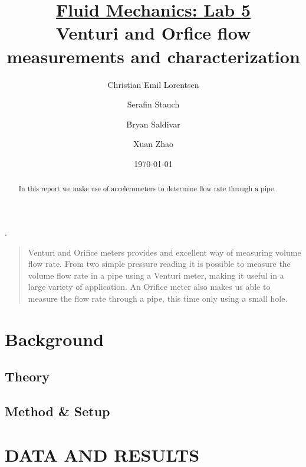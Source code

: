 \documentclass[%
 aapm,
 mph,%
 amsmath,amssymb,
 reprint,%
]{revtex4-2}
\begin{document}
\noindent
{}

\title[]{\underline{Fluid Mechanics: Lab 5} \\
Venturi and Orfice flow measurements and characterization}.%

\author{Christian Emil Lorentsen}%
\author{Serafin Stauch}
\author{Bryan Saldivar}
\author{Xuan Zhao}

\date{\today}%
\begin{abstract}
In this report we make use of accelerometers to determine flow rate through a pipe.

\end{abstract}

\maketitle
\linenumbers\relax %
\begin{quotation}
Venturi and Orifice meters provides and excellent way of measuring volume flow rate. From two simple pressure reading it is possible to measure the volume flow rate in a pipe using a Venturi meter, making it useful in a large variety of application. An Orifice meter also makes us able to measure the flow rate through a pipe, this time only using a small hole.

\end{quotation}
\section{\label{sec:level1}Background}

\subsection{\label{sec:level2}Theory}

\subsection{\label{sec_level3}Method \& Setup}




\newpage
\section{DATA AND RESULTS}
\end{document}
